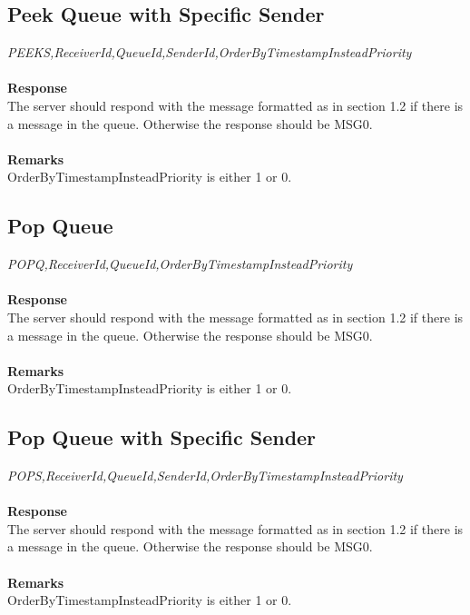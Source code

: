 \documentclass{article}
\begin{document}
            \subsection{Peek Queue with Specific Sender}
                \indent\indent\textit{PEEKS,ReceiverId,QueueId,SenderId,OrderByTimestampInsteadPriority}\\
            \\
            \textbf{Response}\\
            The server should respond with the message formatted as in section 1.2 if there is a message in the queue. Otherwise the response should be MSG0.\\
            \\
            \textbf{Remarks}\\
            OrderByTimestampInsteadPriority is either 1 or 0.


            \subsection{Pop Queue}
                \indent\indent\textit{POPQ,ReceiverId,QueueId,OrderByTimestampInsteadPriority}\\
                \\
                \textbf{Response}\\
                The server should respond with the message formatted as in section 1.2 if there is a message in the queue. Otherwise the response should be MSG0.\\
                \\
                \textbf{Remarks}\\
                OrderByTimestampInsteadPriority is either 1 or 0.

            \subsection{Pop Queue with Specific Sender}
                \indent\indent\textit{POPS,ReceiverId,QueueId,SenderId,OrderByTimestampInsteadPriority}\\
                \\
                \textbf{Response}\\
                The server should respond with the message formatted as in section 1.2 if there is a message in the queue. Otherwise the response should be MSG0.\\
                \\
                \textbf{Remarks}\\
                OrderByTimestampInsteadPriority is either 1 or 0.
\end{document}
